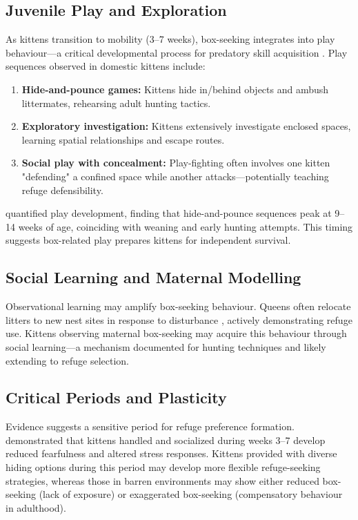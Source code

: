 \documentclass[12pt,a4paper]{article}
\begin{document}
\subsection{Juvenile Play and Exploration}

As kittens transition to mobility (3–7 weeks), box-seeking integrates into play behaviour—a critical developmental process for predatory skill acquisition \citep{caro1980}. Play sequences observed in domestic kittens include:

\begin{enumerate}
    \item \textbf{Hide-and-pounce games:} Kittens hide in/behind objects and ambush littermates, rehearsing adult hunting tactics.
    
    \item \textbf{Exploratory investigation:} Kittens extensively investigate enclosed spaces, learning spatial relationships and escape routes.
    
    \item \textbf{Social play with concealment:} Play-fighting often involves one kitten "defending" a confined space while another attacks—potentially teaching refuge defensibility.
\end{enumerate}

\citet{west1974} quantified play development, finding that hide-and-pounce sequences peak at 9–14 weeks of age, coinciding with weaning and early hunting attempts. This timing suggests box-related play prepares kittens for independent survival.

\subsection{Social Learning and Maternal Modelling}

Observational learning may amplify box-seeking behaviour. Queens often relocate litters to new nest sites in response to disturbance \citep{feldman1994}, actively demonstrating refuge use. Kittens observing maternal box-seeking may acquire this behaviour through social learning—a mechanism documented for hunting techniques \citep{caro1980b} and likely extending to refuge selection.

\subsection{Critical Periods and Plasticity}

Evidence suggests a sensitive period for refuge preference formation. \citet{karsh1983} demonstrated that kittens handled and socialized during weeks 3–7 develop reduced fearfulness and altered stress responses. Kittens provided with diverse hiding options during this period may develop more flexible refuge-seeking strategies, whereas those in barren environments may show either reduced box-seeking (lack of exposure) or exaggerated box-seeking (compensatory behaviour in adulthood).
\end{document}
